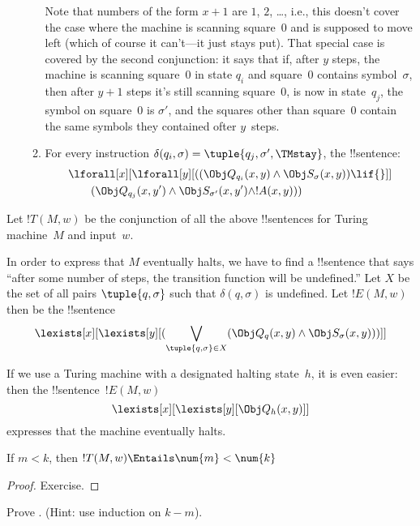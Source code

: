 \documentclass[../../../include/open-logic-section]{subfiles}
\begin{document}
\begin{enumerate}
\begin{enumerate}
Note that numbers of the form $x+1$ are $1$, $2$, \dots, i.e., this
doesn't cover the case where the machine is scanning square~$0$ and is
supposed to move left (which of course it can't---it just stays
put). That special case is covered by the second conjunction: it says
that if, after $y$ steps, the machine is scanning square~$0$ in state
$q_i$ and square~$0$ contains symbol~$\sigma$, then after $y+1$ steps
it's still scanning square~$0$, is now in state~$q_j$, the symbol on
square~$0$ is $\sigma'$, and the squares other than square~$0$ contain
the same symbols they contained ofter $y$~steps.
\item {} For every instruction $\delta(q_i, \sigma) =
  \tuple{q_j, \sigma', \TMstay}$, the !!{sentence}:
\begin{align*}
& \lforall[x][\lforall[y][(
   (\Obj Q_{q_i}(x, y) \land \Obj S_{\sigma}(x, y)) \lif {}]] \\
&\qquad   (\Obj Q_{q_j}(x, y') \land \Obj S_{\sigma'}(x, y') \land
!A(x, y)))
\end{align*}
\end{enumerate}
\end{enumerate}
Let $!T(M, w)$ be the conjunction of all the above !!{sentence}s for Turing
machine~$M$ and input~$w$.

In order to express that $M$ eventually halts, we have to find a
!!{sentence} that says ``after some number of steps, the transition
function will be undefined.''  Let $X$ be the set of all pairs
$\tuple{q, \sigma}$ such that $\delta(q, \sigma)$ is undefined.  Let
$!E(M, w)$ then be the !!{sentence}
\[
\lexists[x][\lexists[y][(\bigvee_{\tuple{q, \sigma} \in
      X}(\Obj Q_q(x, y) \land \Obj S_\sigma(x, y)))]]
\]

If we use a Turing machine with a designated halting state~$h$, it
is even easier: then the !!{sentence}~$!E(M, w)$
\[
\lexists[x][\lexists[y][\Obj Q_h(x, y)]]
\]
expresses that the machine eventually halts.

\begin{prop}
If $m < k$, then $!T(M, w) \Entails \num{m} < \num{k}$
\end{prop}

\begin{proof}
Exercise.
\end{proof}

\begin{prob}
Prove .
(Hint: use induction on $k-m$).
\end{prob}
\end{document}
